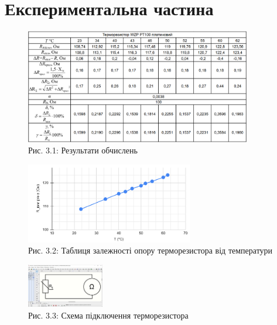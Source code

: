 \documentclass[a4paper]{article}
\begin{document}
\newpage 



\section*{Експериментальна частина}

\begin{figure}[h]
    \centering
\includegraphics[width=0.88\textwidth]{imgs/LW3.1.png}
    \caption*{Рис. 3.1: Результати обчислень}
\end{figure} 

\begin{figure}[h]
    \centering
\includegraphics[width=0.65\textwidth]{imgs/LW3.3.png}
    \caption*{Рис. 3.2: Таблиця залежності опору терморезистора від температури}
\end{figure} 

\begin{figure}[h]
    \centering
\includegraphics[width=0.3\textwidth]{imgs/LW3.2.png}
    \caption*{Рис. 3.3: Схема підключення терморезистора}
\end{figure} 
\end{document}
